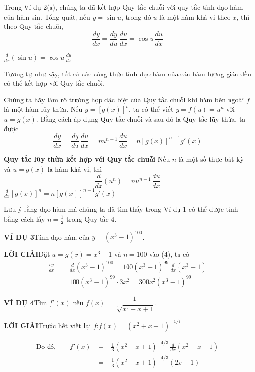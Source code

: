 Trong Ví dụ 2(a), chúng ta đã kết hợp Quy tắc chuỗi với quy tắc tính đạo hàm của hàm sin. Tổng quát, nếu $y = \sin u$, trong đó $u$ là một hàm khả vi theo $x$, thì theo Quy tắc chuỗi,
\[
\frac{dy}{dx} = \frac{dy}{du}\,\frac{du}{dx} = \cos u\,\frac{du}{dx}
\]

\noindent{}\hfill $\displaystyle \frac{d}{dx}(\sin u) = \cos u\,\frac{du}{dx}$\hfill\null

\vspace{3pt}
Tương tự như vậy, tất cả các công thức tính đạo hàm của các hàm lượng giác đều có thể kết hợp với Quy tắc chuỗi.

Chúng ta hãy làm rõ trường hợp đặc biệt của Quy tắc chuỗi khi hàm bên ngoài $f$ là một hàm lũy thừa. Nếu $y = [g(x)]^n$, ta có thể viết $y = f(u) = u^n$ với $u = g(x)$. Bằng cách áp dụng Quy tắc chuỗi và sau đó là Quy tắc lũy thừa, ta được
\[
\frac{dy}{dx} = \frac{dy}{du}\,\frac{du}{dx} = n u^{n-1}\,\frac{du}{dx} = n [g(x)]^{n-1} g'(x)
\]

\begin{rulebox}
    \noindent
    {\setlength{\fboxsep}{2pt}\setlength{\fboxrule}{0.8pt}\textcolor{stewartred}{}}\;\;
    \textbf{\textsf{\color{stewartred}Quy tắc lũy thừa kết hợp với Quy tắc chuỗi}}\quad
    Nếu $n$ là một số thực bất kỳ và $u = g(x)$ là hàm khả vi, thì
    \[
    \frac{d}{dx}(u^n) = n u^{n-1}\,\frac{du}{dx}
    \]
    \noindent{}\hfill $\displaystyle \frac{d}{dx}[g(x)]^n = n [g(x)]^{n-1} g'(x)$\hfill\null
\end{rulebox}

\vspace{3pt}
Lưu ý rằng đạo hàm mà chúng ta đã tìm thấy trong Ví dụ 1 có thể được tính bằng cách lấy $n = \frac{1}{2}$ trong Quy tắc 4.

\vspace{8pt}
\noindent
\textbf{\textsf{\color{stewartcyan}VÍ DỤ 3}}\quad Tính đạo hàm của $y = (x^3 - 1)^{100}$.

\vspace{3pt}
\noindent
\textbf{\textsf{\color{stewartcyan}LỜI GIẢI}}\quad Đặt $u = g(x) = x^3 - 1$ và $n = 100$ vào (4), ta có
\begin{align*}
\frac{dy}{dx} &= \frac{d}{dx}(x^3 - 1)^{100} = 100(x^3 - 1)^{99}\,\frac{d}{dx}(x^3 - 1) \\[4pt]
&= 100(x^3 - 1)^{99} \cdot 3x^2 = 300x^2(x^3 - 1)^{99} \tag*{\stewarttombstone}
\end{align*}

\vspace{8pt}
\noindent
\textbf{\textsf{\color{stewartcyan}VÍ DỤ 4}}\quad Tìm $f'(x)$ nếu $f(x) = \dfrac{1}{\sqrt[3]{x^2 + x + 1}}$.

\vspace{3pt}
\noindent
\textbf{\textsf{\color{stewartcyan}LỜI GIẢI}}\quad Trước hết viết lại $f$:\qquad $f(x) = (x^2 + x + 1)^{-1/3}$

\begin{align*}
\text{Do đó,}\qquad f'(x) &= -\frac{1}{3}(x^2 + x + 1)^{-4/3}\,\frac{d}{dx}(x^2 + x + 1) \\[4pt]
&= -\frac{1}{3}(x^2 + x + 1)^{-4/3}(2x + 1) \tag*{\stewarttombstone}
\end{align*}
